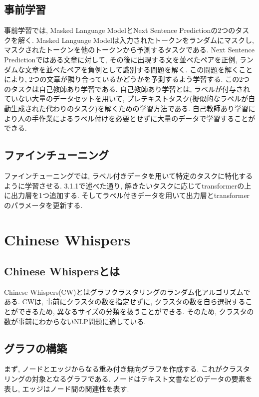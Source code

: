 \subsection{事前学習}
事前学習では, Masked Language ModelとNext Sentence Predictionの2つのタスクを解く. Masked Language Modelは入力されたトークンをランダムにマスクし, マスクされたトークンを他のトークンから予測するタスクである. Next Sentence Predictionではある文章に対して, その後に出現する文を並べたペアを正例, ランダムな文章を並べたペアを負例として識別する問題を解く. この問題を解くことにより, 2つの文章が隣り合っているかどうかを予測するよう学習する. 
この2つのタスクは自己教師あり学習である. 自己教師あり学習とは, ラベルが付与されていない大量のデータセットを用いて, プレテキストタスク(擬似的なラベルが自動生成された代わりのタスク)を解くための学習方法である. 自己教師あり学習により人の手作業によるラベル付けを必要とせずに大量のデータで学習することができる. 

\subsection{ファインチューニング}
ファインチューニングでは, ラベル付きデータを用いて特定のタスクに特化するように学習させる. 3.1.1で述べた通り, 解きたいタスクに応じてtransformerの上に出力層を1つ追加する. そしてラベル付きデータを用いて出力層とtransformerのパラメータを更新する. 


\section{Chinese Whispers}
\subsection{Chinese Whispersとは}
Chinese Whispers(CW)\cite{chinese-whispers}とはグラフクラスタリングのランダム化アルゴリズムである. CWは, 事前にクラスタの数を指定せずに, クラスタの数を自ら選択することができるため, 異なるサイズの分類を扱うことができる. そのため, クラスタの数が事前にわからないNLP問題に適している. 

\subsection{グラフの構築}
まず, ノードとエッジからなる重み付き無向グラフを作成する. これがクラスタリングの対象となるグラフである. ノードはテキスト文書などのデータの要素を表し, エッジはノード間の関連性を表す. 

